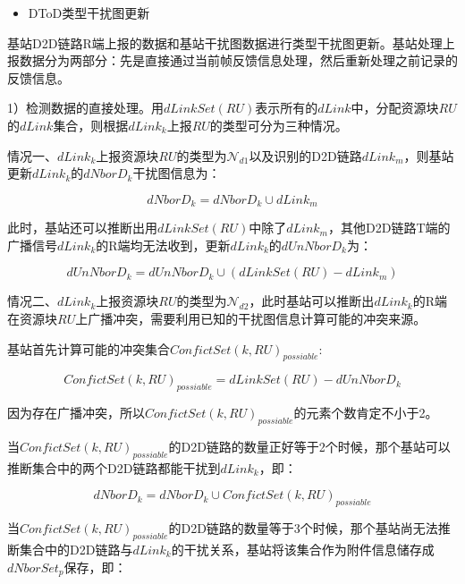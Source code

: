 \documentclass[figurelist,tablelist,algorithmlist,nomlist,masters]{seuthesix}
\begin{document}
	
	
	\begin{itemize}
		\item DToD类型干扰图更新
	\end{itemize}
	
	基站D2D链路R端上报的数据和基站干扰图数据进行类型干扰图更新。基站处理上报数据分为两部分：先是直接通过当前帧反馈信息处理，然后重新处理之前记录的反馈信息。
	
	1）检测数据的直接处理。用$dLinkSet(RU)$表示所有的$dLink$中，分配资源块$RU$的$dLink$集合，则根据$dLink_k$上报$RU$的类型可分为三种情况。
	
	情况一、$dLink_k$上报资源块$RU$的类型为$\mathcal{N}_{d1}$以及识别的D2D链路$dLink_m$，则基站更新$dLink_k$的$dNborD_k$干扰图信息为：
	
	\begin{equation}\label{eq2.12}
	dNborD_k = dNborD_k \cup dLink_m
	\end{equation}
	
	此时，基站还可以推断出用$dLinkSet(RU)$中除了$dLink_m$，其他D2D链路T端的广播信号$dLink_k$的R端均无法收到，更新$dLink_k$的$dUnNborD_k$为：
	
	\begin{equation}\label{eq2.13}
	dUnNborD_k = dUnNborD_k \cup (dLinkSet(RU) - dLink_m)
	\end{equation}
	
	
	情况二、$dLink_k$上报资源块$RU$的类型为$\mathcal{N}_{d2}$，此时基站可以推断出$dLink_k$的R端在资源块$RU$上广播冲突，需要利用已知的干扰图信息计算可能的冲突来源。
	
	基站首先计算可能的冲突集合$ConfictSet{(k,RU)_{possiable}}$:
	
	\begin{equation}\label{eq2.14}
	ConfictSet{(k,RU)_{possiable}} = dLinkSet(RU) - dUnNborD_k
	\end{equation}
	
	因为存在广播冲突，所以$ConfictSet{(k,RU)_{possiable}}$的元素个数肯定不小于2。
	
	当$ConfictSet{(k,RU)_{possiable}}$的D2D链路的数量正好等于2个时候，那个基站可以推断集合中的两个D2D链路都能干扰到$dLink_k$，即：
	
	\begin{equation}\label{eq2.15}
	dNborD_k = dNborD_k \cup ConfictSet{(k,RU)_{possiable}}
	\end{equation}
	
	当$ConfictSet{(k,RU)_{possiable}}$的D2D链路的数量等于3个时候，那个基站尚无法推断集合中的D2D链路与$dLink_k$的干扰关系，基站将该集合作为附件信息储存成$dNborSet_{p}$保存，即：
	
\end{document}
